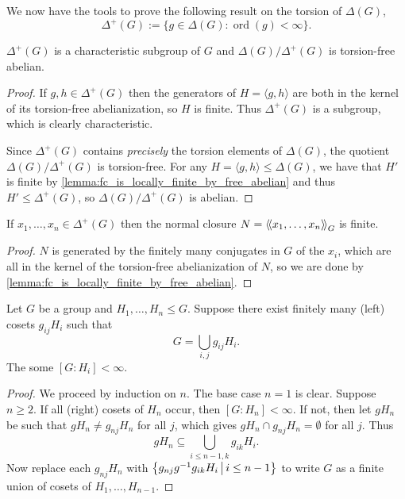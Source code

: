 We now have the tools to prove the following result on the torsion of $\Delta(G)$, \[
    \Delta^+(G) := \{g \in \Delta(G) : \operatorname{ord}(g) < \infty \}.
\]

\begin{lemma}[B.H. Neumann]
    \label{lemma:neumann_fc}
    $\Delta^+(G)$ is a characteristic subgroup of $G$ and $\Delta(G) / \Delta^+(G)$ is torsion-free abelian.
\end{lemma}

\begin{proof}
    If $g, h \in \Delta^+(G)$ then the generators of $H = \langle g, h \rangle$ are both in the kernel of its torsion-free abelianization, so $H$ is finite.
    Thus $\Delta^+(G)$ is a subgroup, which is clearly characteristic.

    Since $\Delta^+(G)$ contains \emph{precisely} the torsion elements of $\Delta(G)$, the quotient $\Delta(G) / \Delta^+(G)$ is torsion-free.
    For any $H = \langle g, h \rangle \leq \Delta(G)$, we have that $H'$ is finite by \cref{lemma:fc_is_locally_finite_by_free_abelian} and thus $H' \leq \Delta^+(G)$, so $\Delta(G) / \Delta^+(G)$ is abelian.
\end{proof}

\begin{lemma}
    \label{lemma:ncls_finite_delta}
    If $x_1, \dots, x_n \in \Delta^+(G)$ then the normal closure $N = \left\langle\!\left\langle x_1, \dots, x_n \right\rangle\!\right\rangle_G$ is finite.
\end{lemma}

\begin{proof}
    $N$ is generated by the finitely many conjugates in $G$ of the $x_i$, which are all in the kernel of the torsion-free abelianization of $N$, so we are done by \cref{lemma:fc_is_locally_finite_by_free_abelian}.
\end{proof}

\begin{lemma}[B.H. Neumann]
    \label{lemma:neumann_cosets}
    Let $G$ be a group and $H_1, \dots, H_n \leq G$.
    Suppose there exist finitely many (left) cosets $g_{ij} H_i$ such that \[
        G = \bigcup_{i,j} g_{ij} H_i.
    \]
    The some $[G : H_i] < \infty$.
\end{lemma}

\begin{proof}
    We proceed by induction on $n$.
    The base case $n=1$ is clear.
    Suppose $n \geq 2$.
    If all (right) cosets of $H_n$ occur, then $[G : H_n] < \infty$.
    If not, then let $g H_n$ be such that $g H_n \neq g_{nj} H_n$ for all $j$, which gives $g H_n \cap g_{nj} H_n = \emptyset$ for all $j$.
    Thus \[
        g H_n \subseteq \bigcup_{i \leq n-1, k} g_{ik} H_i.
    \]
    Now replace each $g_{nj} H_n$ with $\left\{ g_{nj} g^{-1} g_{ik} H_i \,\middle|\, i \leq n-1 \right\}$ to write $G$ as a finite union of cosets of $H_1, \dots, H_{n-1}$.
\end{proof}

